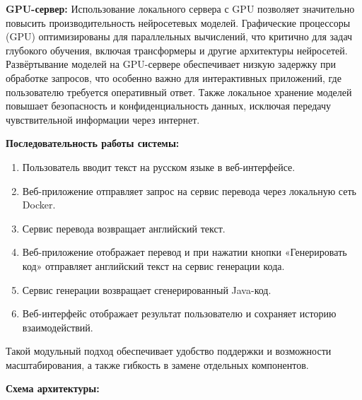 \textbf{GPU-сервер:}  
Использование локального сервера с GPU позволяет значительно повысить производительность нейросетевых моделей. Графические процессоры (GPU) оптимизированы для параллельных вычислений, что критично для задач глубокого обучения, включая трансформеры и другие архитектуры нейросетей.  
Развёртывание моделей на GPU-сервере обеспечивает низкую задержку при обработке запросов, что особенно важно для интерактивных приложений, где пользователю требуется оперативный ответ. Также локальное хранение моделей повышает безопасность и конфиденциальность данных, исключая передачу чувствительной информации через интернет.

\bigskip

\textbf{Последовательность работы системы:}
\begin{enumerate}
    \item Пользователь вводит текст на русском языке в веб-интерфейсе.
    \item Веб-приложение отправляет запрос на сервис перевода через локальную сеть Docker.
    \item Сервис перевода возвращает английский текст.
    \item Веб-приложение отображает перевод и при нажатии кнопки «Генерировать код» отправляет английский текст на сервис генерации кода.
    \item Сервис генерации возвращает сгенерированный Java-код.
    \item Веб-интерфейс отображает результат пользователю и сохраняет историю взаимодействий.
\end{enumerate}

Такой модульный подход обеспечивает удобство поддержки и возможности масштабирования, а также гибкость в замене отдельных компонентов.

\bigskip

\textbf{Схема архитектуры:}

